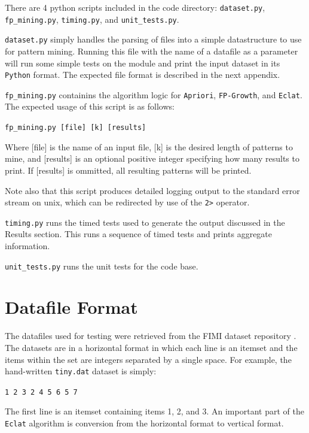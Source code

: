 \documentclass[11pt]{article}
\begin{document}
\begin{multicols}{2}
There are 4 python scripts included in the code directory:
\texttt{dataset.py}, \texttt{fp\_mining.py}, \texttt{timing.py}, and
\texttt{unit\_tests.py}.

\texttt{dataset.py} simply handles the parsing of files into a simple
datastructure to use for pattern mining.  Running this file with the
name of a datafile as a parameter will run some simple tests on the
module and print the input dataset in its \texttt{Python} format.  The
expected file format is described in the next appendix.

\texttt{fp\_mining.py} containins the algorithm logic for
\texttt{Apriori}, \texttt{FP-Growth}, and \texttt{Eclat}.  The
expected usage of this script is as follows:

\texttt{fp\_mining.py [file] [k] [results]}

Where [file] is the name of an input file, [k] is the desired length
of patterns to mine, and [results] is an optional positive integer
specifying how many results to print.  If [results] is ommitted, all
resulting patterns will be printed.

Note also that this script produces detailed logging output to the
standard error stream on unix, which can be redirected by use of the
\texttt{2>} operator.

\texttt{timing.py} runs the timed tests used to generate the output
discussed in the Results section.  This runs a sequence
of timed tests and prints aggregate information.

\texttt{unit\_tests.py} runs the unit tests for the code base.

\section{Datafile Format}

The datafiles used for testing were retrieved from the FIMI dataset
repository \cite{fimiDatasetRepo}.  The datasets are in a horizontal
format in which each line is an itemset and the items within the set
are integers separated by a single space.  For example, the
hand-written \texttt{tiny.dat} dataset is simply:

\texttt{1 2 3 2 4 5 6 5 7}

The first line is an itemset containing items 1, 2, and 3.  An
important part of the \texttt{Eclat} algorithm is conversion from the
horizontal format to vertical format.


\end{multicols}
\end{document}
